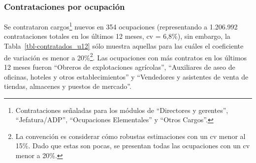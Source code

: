 \documentclass[
  11pt,
]{article}
\begin{document}
\FloatBarrier

\begin{table}

\caption{\label{tbl-contratos_totales}Porcentaje de empresas que
contrataron en los últimos 12 meses por sector económico}


\end{table}%

\FloatBarrier

\subsubsection{Contrataciones por
ocupación}\label{contrataciones-por-ocupaciuxf3n}

Se contrataron cargos\footnote{Contrataciones señaladas para los módulos
  de ``Directores y gerentes'', ``Jefatura/ADP'', ``Ocupaciones
  Elementales'' y ``Otros Cargos''.} nuevos en 354 ocupaciones
(representando a 1.206.992 contrataciones totales en los últimos 12
meses, cv = 6,8\%), sin embargo, la Tabla~\ref{tbl-contratados_u12} sólo
muestra aquellas para las cuáles el coeficiente de variación es menor a
20\%\footnote{La convención es considerar cómo robustas estimaciones con
  un cv menor al 15\%. Dado que estas son pocas, se presentan todas las
  ocupaciones con un cv menor a 20\%.}. Las ocupaciones con más
contratos en los últimos 12 meses fueron ``Obreros de explotaciones
agrícolas'', ``Auxiliares de aseo de oficinas, hoteles y otros
establecimientos'' y ``Vendedores y asistentes de venta de tiendas,
almacenes y puestos de mercado''.
\end{document}
